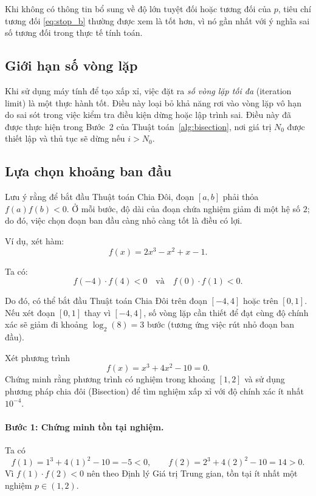 Khi không có thông tin bổ sung về độ lớn tuyệt đối hoặc tương đối của $p$, tiêu chí
tương đối \eqref{eq:stop_b} thường được xem là tốt hơn, vì nó gần nhất với ý nghĩa
sai số tương đối trong thực tế tính toán.

\subsection*{Giới hạn số vòng lặp}
\label{subsec:max_iterations}

Khi sử dụng máy tính để tạo xấp xỉ, việc đặt ra \textit{số vòng lặp tối đa} (iteration limit)
là một thực hành tốt. Điều này loại bỏ khả năng rơi vào vòng lặp vô hạn do sai sót trong việc
kiểm tra điều kiện dừng hoặc lập trình sai. Điều này đã được thực hiện trong Bước~2 của
Thuật toán~\ref{alg:bisection}, nơi giá trị $N_0$ được thiết lập và thủ tục sẽ dừng nếu
$i > N_0$.

\subsection*{Lựa chọn khoảng ban đầu}
\label{subsec:initial_interval}

Lưu ý rằng để bắt đầu Thuật toán Chia Đôi, đoạn $[a,b]$ phải thỏa $f(a)f(b) < 0$.
Ở mỗi bước, độ dài của đoạn chứa nghiệm giảm đi một hệ số $2$; do đó, việc chọn
đoạn ban đầu càng nhỏ càng tốt là điều có lợi.

Ví dụ, xét hàm:
\[
f(x) = 2x^3 - x^2 + x - 1.
\]

Ta có:
\[
f(-4)\cdot f(4) < 0
\quad\text{và}\quad
f(0)\cdot f(1) < 0.
\]

Do đó, có thể bắt đầu Thuật toán Chia Đôi trên đoạn $[-4,4]$ hoặc trên $[0,1]$.
Nếu xét đoạn $[0,1]$ thay vì $[-4,4]$, số vòng lặp cần thiết để đạt cùng độ chính xác
sẽ giảm đi khoảng $\log_2(8) = 3$ bước (tương ứng việc rút nhỏ đoạn ban đầu).

\label{subsec:example1}

\begin{example}
Xét phương trình
\[
f(x) = x^3 + 4x^2 - 10 = 0.
\]
Chứng minh rằng phương trình có nghiệm trong khoảng $[1,2]$ và sử dụng
phương pháp chia đôi (Bisection) để tìm nghiệm xấp xỉ với độ chính xác
ít nhất $10^{-4}$.
\end{example}

\paragraph*{Bước 1: Chứng minh tồn tại nghiệm.}
Ta có
\[
f(1) = 1^3 + 4(1)^2 - 10 = -5 < 0,
\qquad
f(2) = 2^3 + 4(2)^2 - 10 = 14 > 0.
\]
Vì $f(1)\cdot f(2) < 0$ nên theo Định lý Giá trị Trung gian,
tồn tại ít nhất một nghiệm $p \in (1,2)$.

